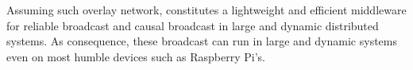 Assuming such overlay network, \RPCBROADCAST constitutes a lightweight and
efficient middleware for reliable broadcast and causal broadcast in large and
dynamic distributed systems. As consequence, these broadcast can run in large
and dynamic systems even on most humble devices such as Raspberry Pi's.


